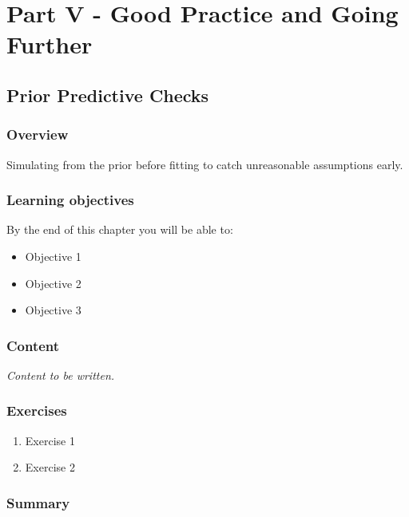 \documentclass[
  11pt,
  a4paper,
  oneside,
  openany]{scrbook}
\providecommand{\tightlist}{%
  \setlength{\itemsep}{0pt}\setlength{\parskip}{0pt}}\usepackage{longtable,booktabs,array}
\begin{document}
\part{Part V - Good Practice and Going Further}

\chapter{Prior Predictive Checks}\label{prior-predictive-checks}

\section{Overview}\label{overview-12}

Simulating from the prior before fitting to catch unreasonable
assumptions early.

\section{Learning objectives}\label{learning-objectives-12}

By the end of this chapter you will be able to:

\begin{itemize}
\tightlist
\item[$\square$]
  Objective 1
\item[$\square$]
  Objective 2
\item[$\square$]
  Objective 3
\end{itemize}

\section{Content}\label{content-11}

\emph{Content to be written.}

\section{Exercises}\label{exercises-12}

\begin{enumerate}
\def\labelenumi{\arabic{enumi}.}
\tightlist
\item
  Exercise 1
\item
  Exercise 2
\end{enumerate}

\section{Summary}\label{summary-12}
\end{document}
